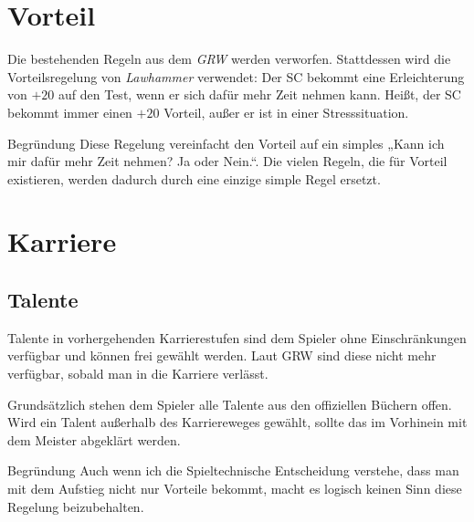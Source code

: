 \documentclass[a4paper,10pt,twoside,twocolumn,openany,nodeprecatedcode,bg=print]{dndbook}
\begin{document}

\section{Vorteil}
Die bestehenden Regeln aus dem \textit{GRW} werden verworfen.
Stattdessen wird die Vorteilsregelung von \textit{Lawhammer} verwendet: Der SC bekommt eine Erleichterung von $+20$ auf den Test, wenn er sich dafür mehr Zeit nehmen kann. Heißt, der SC bekommt immer einen $+20$ Vorteil, außer er ist in einer Stresssituation.

\begin{DndComment}{Begründung}
  Diese Regelung vereinfacht den Vorteil auf ein simples „Kann ich mir dafür mehr Zeit nehmen? Ja oder Nein.“. Die vielen Regeln, die für Vorteil existieren, werden dadurch durch eine einzige simple Regel ersetzt.
\end{DndComment}


\vspace{\fill}
\pagebreak

\section{Karriere}
\subsection{Talente}
Talente in vorhergehenden Karrierestufen sind dem Spieler ohne Einschränkungen verfügbar und können frei gewählt werden.
Laut GRW sind diese nicht mehr verfügbar, sobald man in die Karriere verlässt.

Grundsätzlich stehen dem Spieler alle Talente aus den offiziellen Büchern offen.
Wird ein Talent außerhalb des Karriereweges gewählt, sollte das im Vorhinein mit dem Meister abgeklärt werden.

\begin{DndComment}{Begründung}
  Auch wenn ich die Spieltechnische Entscheidung verstehe, dass man mit dem Aufstieg nicht nur Vorteile bekommt, macht es logisch keinen Sinn diese Regelung beizubehalten.
\end{DndComment}
\end{document}
